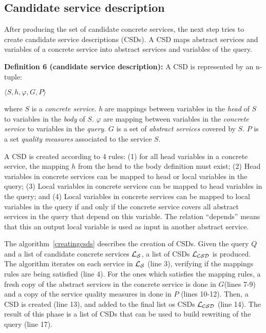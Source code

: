 \subsection{Candidate service description}

After producing the set of candidate concrete services, the next step tries 
to create candidate service descriptions (CSDs). 
A CSD maps abstract services and variables of a concrete service into abstract 
services and variables of the query. 

\noindent \textbf{Definition 6 (candidate service description):} A CSD is represented by an n-tuple:
\begin{center}
$\langle S, h, \varphi, G, P\rangle$
\end{center}
where $S$ is a \textit{concrete service}. 
\textit{h} are mappings between variables in the \textit{head} of $S$ to variables in the \textit{body} of $S$. 
$\varphi$ are mapping between variables in the \textit{concrete service} to variables in the \textit{query}.
$G$ is a set of \textit{abstract services} covered by $S$. 
$P$ is a set \textit{quality measures} associated to the service $S$. 
 
A CSD is created according to 4 rules: (1) for all head variables in a concrete service, the mapping $h$ from the head to the body definition must exist; (2) Head variables in concrete services can be mapped to head or local variables in the query; (3) Local variables in concrete services can be mapped to head variables in the query;
and (4) Local variables in concrete services can be mapped to local
variables in the query if and only if the concrete service covers all abstract services in the query that depend on this variable. The relation ``depends''  means that this an output local variable is used as input in another abstract service. 

The algorithm~\ref{creatingcsds} describes the creation of CSDs. Given the query $Q$ and a list of candidate concrete services $\hbox{${\cal L_{S}}$}$, a list of CSDs $\hbox{${\cal L_{CSD}}$}$ is produced. 
The algorithm iterates on each service in $\hbox{${\cal L_{S}}$}$ (line 3), verifying if the mappings rules are being satisfied (line 4). For the ones which satisfies the mapping rules, a fresh copy of the abstract services in the concrete service is done in $G$(lines 7-9) and a copy of the service quality measures in done in $P$ (lines 10-12). Then,
a CSD is created (line 13), and added to the final list os CSDs $\hbox{${\cal L_{CSD}}$}$ (line 14).
The result of this phase is a list of CSDs that can be used to build rewriting of the query (line 17).

